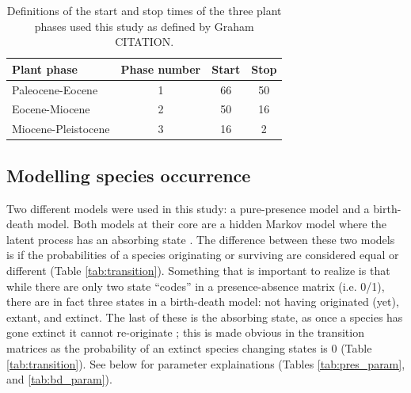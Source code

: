 \documentclass[12pt,letterpaper]{article}
\begin{document}
\begin{table}
  \centering
  \caption[Plant phase defintions]{Definitions of the start and stop times of the three plant phases used this study as defined by Graham CITATION.}
  \label{tab:plant_def}
  \begin{tabular}{l c c c}
    Plant phase & Phase number & Start & Stop \\
    \hline
    Paleocene-Eocene & 1 & 66 & 50 \\
    Eocene-Miocene & 2 & 50 & 16 \\
    Miocene-Pleistocene & 3 & 16 & 2 \\
  \end{tabular}
\end{table}


\subsection*{Modelling species occurrence}
Two different models were used in this study: a pure-presence model and a birth-death model. Both models at their core are a hidden Markov model where the latent process has an absorbing state \citep{Allen2011}. The difference between these two models is if the probabilities of a species originating or surviving are considered equal or different (Table \ref{tab:transition}). Something that is important to realize is that while there are only two state ``codes'' in a presence-absence matrix (i.e. 0/1), there are in fact three states in a birth-death model: not having originated (yet), extant, and extinct. The last of these is the absorbing state, as once a species has gone extinct it cannot re-originate \citep{Allen2011}; this is made obvious in the transition matrices as the probability of an extinct species changing states is 0 (Table \ref{tab:transition}). See below for parameter explainations (Tables \ref{tab:pres_param}, and \ref{tab:bd_param}).
\end{document}
